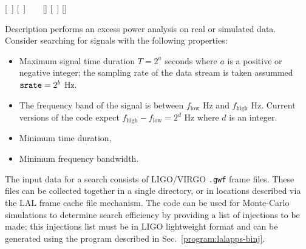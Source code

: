 \begin{entry}
 \newline \hspace*{0.5in}
[~] \newline \hspace*{0.5in}
[~] \newline \hspace*{0.5in}
~ \newline \hspace*{0.5in}
~ \newline \hspace*{0.5in}
[] \newline \hspace*{0.5in}
[~] \newline \hspace*{0.5in}
[] \newline \hspace*{0.5in}
~ \newline \hspace*{0.5in}
~ \newline \hspace*{0.5in}
~

\item[Description] 
 performs an excess power analysis on real or
simulated data.  Consider searching for signals with the following
properties:
\begin{itemize}
\item Maximum signal time duration $T=2^a$ seconds where $a$ is a positive
or negative integer;  the sampling rate of the data stream is taken
assummed $\mbox{\texttt{srate}} = 2^b$ Hz.

\item The frequency band of the signal is between $f_{\mathrm{low}}$ Hz and
${f_{\mathrm{high}}}$ Hz.  Current versions of the code expect
${f_{\mathrm{high}}}-{f_{\mathrm{low}}}=2^d$ Hz where $d$ is an integer. 

\item Minimum time duration,

\item Minimum frequency bandwidth.
\end{itemize}

The input data for a search consists of LIGO/VIRGO \texttt{.gwf} frame
files.  These files can be collected together in a single directory, or in
locations described via the LAL frame cache file mechanism.  The code can
be used for Monte-Carlo simulations to determine search efficiency by
providing a list of injections to be made;  this injections list must be in
LIGO lightweight format and can be generated using the 
program described in Sec.~\ref{program:lalapps-binj}. 


\end{entry}

